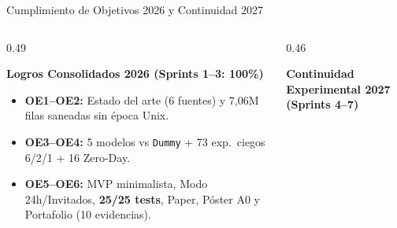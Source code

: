 \documentclass[aspectratio=169, 10pt]{beamer}
\begin{document}
\begin{frame}{Cumplimiento de Objetivos 2026 y Continuidad 2027}
  \begin{columns}[T]
    \begin{column}{0.49\textwidth}
      \begin{exampleblock}{\textbf{Logros Consolidados 2026 (Sprints 1--3: 100\%)}}
        \footnotesize
        \begin{itemize}
          \item \textbf{OE1--OE2:} Estado del arte (6 fuentes) y 7,06M filas saneadas sin época Unix.
          \item \textbf{OE3--OE4:} 5 modelos vs \texttt{Dummy} + 73 exp.\ ciegos 6/2/1 + 16 Zero-Day.
          \item \textbf{OE5--OE6:} MVP minimalista, Modo 24h/Invitados, \textbf{25/25 tests}, Paper, Póster A0 y Portafolio (10 evidencias).
        \end{itemize}
      \end{exampleblock}
    \end{column}
    \begin{column}{0.46\textwidth}
      \begin{block}{\textbf{Continuidad Experimental 2027 (Sprints 4--7)}}
        \vspace{1mm}
      \end{block}
    \end{column}
  \end{columns}
\end{frame}
\end{document}
